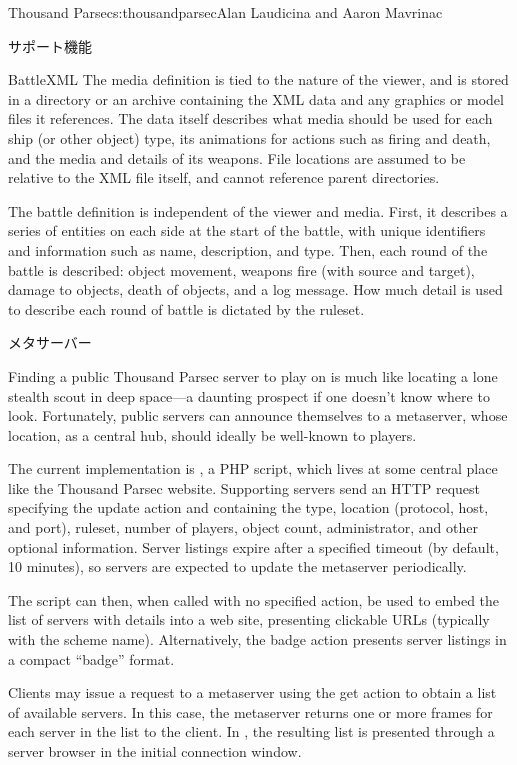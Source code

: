 \begin{aosachapter}{Thousand Parsec}{s:thousandparsec}{Alan Laudicina and Aaron Mavrinac}
\begin{aosasect1}{サポート機能}
\begin{aosasect2}{BattleXML}
The media definition is tied to the nature of the viewer, and is
stored in a directory or an archive containing the XML data and any
graphics or model files it references. The data itself describes what
media should be used for each ship (or other object) type, its
animations for actions such as firing and death, and the media and
details of its weapons. File locations are assumed to be relative to
the XML file itself, and cannot reference parent directories.

The battle definition is independent of the viewer and media. First,
it describes a series of entities on each side at the start of the
battle, with unique identifiers and information such as name,
description, and type. Then, each round of the battle is described:
object movement, weapons fire (with source and target), damage to
objects, death of objects, and a log message. How much detail is used
to describe each round of battle is dictated by the ruleset.

\end{aosasect2}

\begin{aosasect2}{メタサーバー}

Finding a public Thousand Parsec server to play on 
is much like locating a lone stealth scout in deep space---a
daunting prospect if one doesn't know where to look. Fortunately,
public servers can announce themselves to a metaserver, whose
location, as a central hub, should ideally be well-known to players.

The current implementation is , a PHP script,
which lives at some central place like the Thousand Parsec
website. Supporting servers send an HTTP request specifying the update
action and containing the type, location (protocol, host, and port),
ruleset, number of players, object count, administrator, and other
optional information. Server listings expire after a specified timeout
(by default, 10 minutes), so servers are expected to update the
metaserver periodically.

The script can then, when called with no specified action, be used to
embed the list of servers with details into a web site, presenting
clickable URLs (typically with the  scheme
name). Alternatively, the badge action presents server listings in a
compact ``badge'' format.

Clients may issue a request to a metaserver using the get action to
obtain a list of available servers. In this case, the metaserver
returns one or more  frames for each server in the list to
the client. In , the resulting list is presented
through a server browser in the initial connection window.


\end{aosasect2}
\end{aosasect1}
\end{aosachapter}
